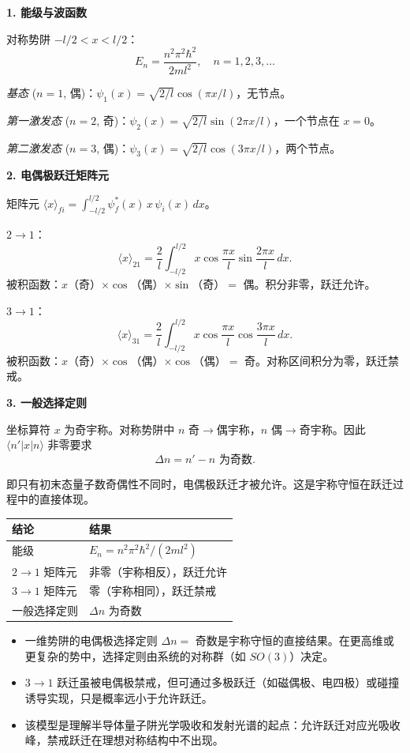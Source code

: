 \begin{derivationbox}[标准解题过程]
\textbf{1. 能级与波函数}

对称势阱 $-l/2<x<l/2$：
\[
E_n=\frac{n^2\pi^2\hbar^2}{2ml^2},\quad n=1,2,3,\ldots
\]

\textit{基态} ($n=1$, 偶)：$\psi_1(x)=\sqrt{2/l}\cos(\pi x/l)$，无节点。

\textit{第一激发态} ($n=2$, 奇)：$\psi_2(x)=\sqrt{2/l}\sin(2\pi x/l)$，一个节点在 $x=0$。

\textit{第二激发态} ($n=3$, 偶)：$\psi_3(x)=\sqrt{2/l}\cos(3\pi x/l)$，两个节点。

\textbf{2. 电偶极跃迁矩阵元}

矩阵元 $\langle x\rangle_{fi}=\int_{-l/2}^{l/2}\psi_f^*(x)\,x\,\psi_i(x)\,dx$。

\textit{$2\to1$}：
\[
\langle x\rangle_{21}=\frac{2}{l}\int_{-l/2}^{l/2}x\cos\frac{\pi x}{l}\sin\frac{2\pi x}{l}\,dx.
\]
被积函数：$x$（奇）$\times\cos$（偶）$\times\sin$（奇）$=$ 偶。积分非零，跃迁允许。

\textit{$3\to1$}：
\[
\langle x\rangle_{31}=\frac{2}{l}\int_{-l/2}^{l/2}x\cos\frac{\pi x}{l}\cos\frac{3\pi x}{l}\,dx.
\]
被积函数：$x$（奇）$\times\cos$（偶）$\times\cos$（偶）$=$ 奇。对称区间积分为零，跃迁禁戒。

\textbf{3. 一般选择定则}

坐标算符 $x$ 为奇宇称。对称势阱中 $n$ 奇$\to$偶宇称，$n$ 偶$\to$奇宇称。因此 $\langle n'|x|n\rangle$ 非零要求
\begin{equation}
\boxed{\Delta n=n'-n\text{ 为奇数}.}
\end{equation}

即只有初末态量子数奇偶性不同时，电偶极跃迁才被允许。这是宇称守恒在跃迁过程中的直接体现。
\end{derivationbox}

\begin{formulabox}[答案汇总]
\begin{center}
\begin{tabular}{ll}
\toprule
\textbf{结论} & \textbf{结果} \\
\midrule
能级 & $E_n=n^2\pi^2\hbar^2/(2ml^2)$ \\
$2\to1$ 矩阵元 & 非零（宇称相反），跃迁允许 \\
$3\to1$ 矩阵元 & 零（宇称相同），跃迁禁戒 \\
一般选择定则 & $\Delta n$ 为奇数 \\
\bottomrule
\end{tabular}
\end{center}
\end{formulabox}

\begin{insightbox}[物理图像]
\begin{itemize}
    \item 一维势阱的电偶极选择定则 $\Delta n=$ 奇数是宇称守恒的直接结果。在更高维或更复杂的势中，选择定则由系统的对称群（如 $SO(3)$）决定。
    \item $3\to1$ 跃迁虽被电偶极禁戒，但可通过多极跃迁（如磁偶极、电四极）或碰撞诱导实现，只是概率远小于允许跃迁。
    \item 该模型是理解半导体量子阱光学吸收和发射光谱的起点：允许跃迁对应光吸收峰，禁戒跃迁在理想对称结构中不出现。
\end{itemize}
\end{insightbox}
